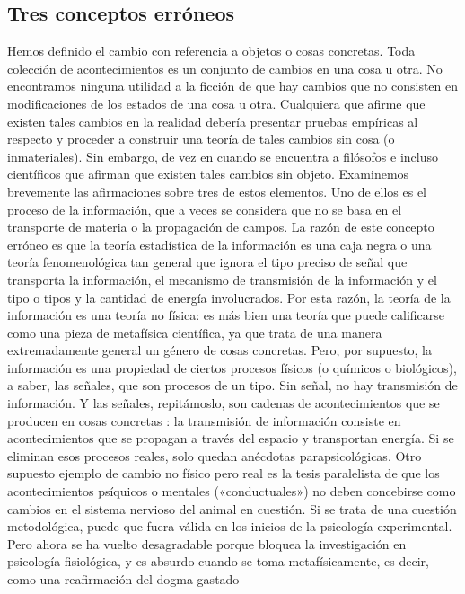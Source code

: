 \begin{justifying}
    \subsection{Tres conceptos erróneos}
    
  Hemos definido el cambio con referencia a objetos o cosas concretas.
  Toda colección de acontecimientos es un conjunto de cambios en una cosa u otra. No
  encontramos ninguna utilidad a la ficción de que hay cambios que no
  consisten en modificaciones de los estados de una cosa u otra. Cualquiera que
  afirme que existen tales cambios en la realidad debería presentar pruebas empíricas
  al respecto y proceder a construir una teoría de tales cambios sin cosa (o
  inmateriales).
  Sin embargo, de vez en cuando se encuentra a filósofos e incluso científicos
  que afirman que existen tales cambios sin objeto. Examinemos
  brevemente las afirmaciones sobre tres de estos elementos. Uno de ellos es el proceso de la información,
  que a veces se considera que no se basa en el transporte de
  materia o la propagación de campos. La razón de este concepto erróneo es
  que la teoría estadística de la información es una caja negra o una teoría fenomenológica
  tan general que ignora el tipo preciso de señal que transporta la
  información, el mecanismo de transmisión de la información y el tipo o tipos
  y la cantidad de energía involucrados. Por esta razón, la teoría de la información es una
  teoría no física: es más bien una teoría que puede calificarse como una pieza de
  metafísica científica, ya que trata de una manera extremadamente general un
  género de cosas concretas. Pero, por supuesto, la información es una propiedad de
  ciertos procesos físicos (o químicos o biológicos), a saber, las señales,
  que son procesos de un tipo. Sin señal, no hay transmisión de información.
  Y las señales, repitámoslo, son cadenas de acontecimientos que se producen en cosas concretas
  : la transmisión de información consiste en acontecimientos que se propagan
  a través del espacio y transportan energía. Si se eliminan esos procesos reales, solo
  quedan anécdotas parapsicológicas.
  Otro supuesto ejemplo de cambio no físico pero real es la
  tesis paralelista de que los acontecimientos psíquicos o mentales («conductuales») no
  deben concebirse como cambios en el sistema nervioso del animal
  en cuestión. Si se trata de una cuestión metodológica, puede que fuera válida en
  los inicios de la psicología experimental. Pero ahora se ha vuelto
  desagradable porque bloquea la investigación en psicología fisiológica, y es
  absurdo cuando se toma metafísicamente, es decir, como una reafirmación del dogma gastado

\end{justifying}
